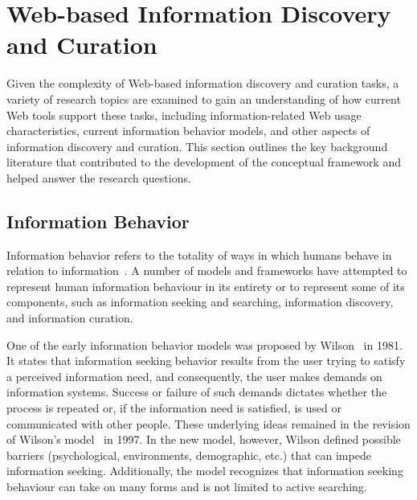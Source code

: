 \documentclass{sigchi}
\begin{document}
\section{Web-based Information Discovery and Curation}
\label{section:literature_review}
Given the complexity of Web-based information discovery and curation tasks, a variety of research topics are examined to gain an understanding of how current Web tools support these tasks, including information-related Web usage characteristics, current information behavior models, and other aspects of information discovery and curation.  This section outlines the key background literature that contributed to the development of the conceptual framework and helped answer the research questions. 

\subsection{Information Behavior}
Information behavior refers to the totality of ways in which humans behave in relation to information~\cite{wilson2000human}.  A number of models and frameworks have attempted to represent human information behaviour in its entirety or to represent some of its components, such as information seeking and searching, information discovery, and information curation. 

One of the early information behavior models was proposed by Wilson~\cite{wilson1981user} in 1981. It states that information seeking behavior results from the user trying to satisfy a perceived information need, and consequently, the user makes demands on information systems. Success or failure of such demands dictates whether the process is repeated or, if the information need is satisfied, is used or communicated with other people. These underlying ideas remained in the revision of Wilson's model~\cite{wilson1997information} in 1997. In the new model, however, Wilson defined possible barriers (psychological, environments, demographic, etc.) that can impede information seeking. Additionally, the model recognizes that information seeking behaviour can take on many forms and is not limited to active searching. 
\end{document}
